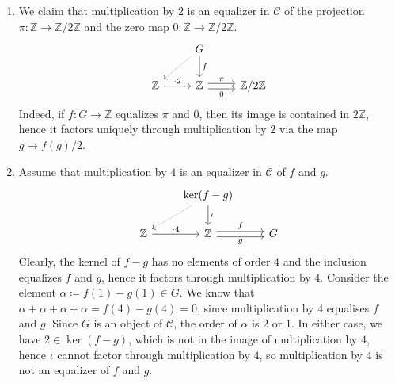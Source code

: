 \begin{enumerate}[label=(\roman*)]
	\item We claim that multiplication by $2$ is an equalizer in $\mathcal{C}$ of the projection
		$\pi\colon \mathbb{Z}\to \mathbb{Z}/2\mathbb{Z}$ and the zero map
		$0\colon \mathbb{Z}\to \mathbb{Z}/2\mathbb{Z}$.
		\[\begin{tikzcd}
			& G\ar[d, "f"]\ar[dl, densely dotted]\\
			\mathbb{Z}\ar[r, "\cdot 2"] & \mathbb{Z}\ar[r, shift left, "\pi"]\ar[r, shift right, "0" below]& \mathbb{Z}/2\mathbb{Z}
		\end{tikzcd}\]
		Indeed, if $f\colon G\to \mathbb{Z}$ equalizes $\pi$ and $0$, then its image
		is contained in $2\mathbb{Z}$, hence it factors uniquely through multiplication
		by $2$ via the map $g\mapsto f(g)/2$.
	\item Assume that multiplication by $4$ is an equalizer in $\mathcal{C}$ of $f$ and $g$.
		\[\begin{tikzcd}
			& \ker (f-g)\ar[d, "\iota"]\ar[dl, densely dotted]\\
			\mathbb{Z}\ar[r, "\cdot 4"] & \mathbb{Z}\ar[r, shift left, "f"]\ar[r, shift right, "g" below]& G
		\end{tikzcd}\]
	Clearly, the kernel of $f-g$ has no elements of order $4$ and the inclusion
		equalizes $f$ and $g$, hence
		it factors through multiplication by $4$. Consider the element
		$\alpha\coloneqq f(1) - g(1) \in G$. We know that $\alpha+\alpha+\alpha+\alpha = f(4) - g(4) = 0$,
		since multiplication by $4$ equalises $f$ and $g$. Since $G$ is an object
		of $\mathcal{C}$, the order of $\alpha$ is $2$ or $1$. In either case,
		we have $2 \in \ker (f - g)$,  which is not in the image of multiplication
		by $4$, hence $\iota$ cannot factor through multiplication by $4$, so
		multiplication by  $4$ is not an equalizer of $f$ and $g$.
\end{enumerate}

